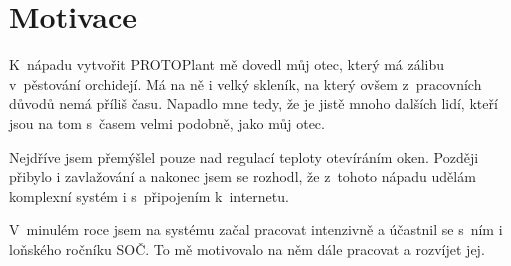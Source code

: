 \chapter{Motivace}
K~nápadu vytvořit  PROTOPlant mě dovedl můj otec, který má zálibu v~pěs\-to\-vá\-ní orchidejí.
Má na ně i velký skleník, na který ovšem z~pracovních důvodů nemá příliš času.
Napadlo mne tedy, že je jistě mnoho dalších lidí, kteří jsou na tom s~časem velmi podobně, jako můj otec.

Nejdříve jsem přemýšlel pouze nad regulací teploty otevíráním oken.
Později přibylo i zavlažování a nakonec jsem se rozhodl, že z~tohoto nápadu udělám komplexní systém i s~připojením k~internetu.

V~minulém roce jsem na systému začal pracovat intenzivně a účastnil se s~ním i loňského ročníku SOČ.
To mě motivovalo na něm dále pracovat a rozvíjet jej.

\newpage